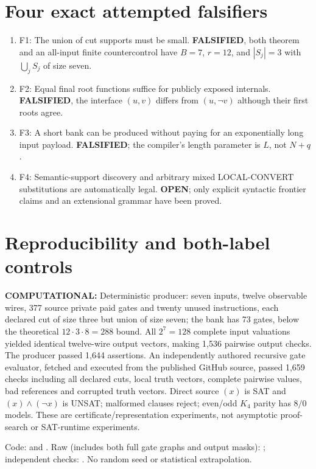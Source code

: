 \documentclass[11pt]{article}
\begin{document}
\section*{Four exact attempted falsifiers}
\begin{enumerate}
\item[] F1: The union of cut supports must be small. \textbf{FALSIFIED}, both theorem and an all-input finite countercontrol have $B=7$, $r=12$, and $|S_j|=3$ with $\bigcup_j S_j$ of size seven.
\item[] F2: Equal final root functions suffice for publicly exposed internals. \textbf{FALSIFIED}, the interface $(u,v)$ differs from $(u,\neg v)$ although their first roots agree.
\item[] F3: A short bank can be produced without paying for an exponentially long input payload. \textbf{FALSIFIED}; the compiler's length parameter is $L$, not $N+q$.
\item[] F4: Semantic-support discovery and arbitrary mixed LOCAL-CONVERT substitutions are automatically legal. \textbf{OPEN}; only explicit syntactic frontier claims and an extensional grammar have been proved.
\end{enumerate}

\section*{Reproducibility and both-label controls}
\noindent\textbf{COMPUTATIONAL:} Deterministic producer: seven inputs, twelve observable wires, 377 source private paid gates and twenty unused instructions, each declared cut of size three but union of size seven; the bank has 73 gates, below the theoretical $12\cdot3\cdot8=288$ bound. All $2^7=128$ complete input valuations yielded identical twelve-wire output vectors, making 1,536 pairwise output checks. The producer passed 1,644 assertions. An independently authored recursive gate evaluator, fetched and executed from the published GitHub source, passed 1,659 checks including all declared cuts, local truth vectors, complete pairwise values, bad references and corrupted truth vectors. Direct source $(x)$ is SAT and $(x)\land(\neg x)$ is UNSAT; malformed clauses reject; even/odd $K_4$ parity has $8/0$ models. These are certificate/representation experiments, not asymptotic proof-search or SAT-runtime experiments.

\noindent Code:  and . Raw (includes both full gate graphs and output masks): ; independent checks: . No random seed or statistical extrapolation.
\end{document}
